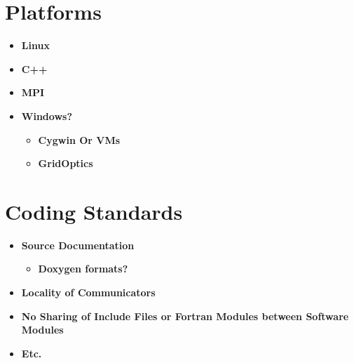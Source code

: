 \documentclass[12pt]{article}
\begin{document}
\section{Platforms}
\begin{itemize}
\item{\bf Linux}
\item{\bf C++}
\item{\bf MPI}
\item{\bf Windows?}
\begin{itemize}
\item{\bf Cygwin Or VMs}
\item{\bf GridOptics}
\end{itemize}
\end{itemize}

\section{Coding Standards}
\begin{itemize}
\item{\bf Source Documentation}
\begin{itemize}
\item{\bf Doxygen formats?}
\end{itemize}
\item{\bf Locality of Communicators}
\item{\bf No Sharing of Include Files or Fortran Modules between Software
Modules}
\item{\bf Etc.}
\end{itemize}
\end{document}
